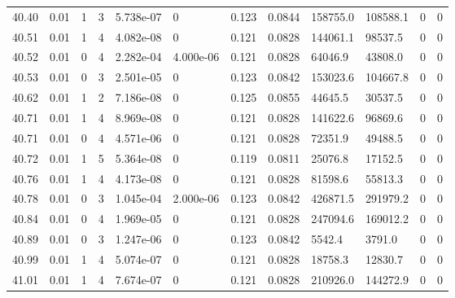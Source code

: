 \documentclass[preview]{standalone}
\begin{document}
{{{{{{{{{{{\begin{tabular}{L{1.2cm}C{1.2cm} C{0.3cm}C{0.5cm} C{1.4cm}C{1.4cm} C{1.4cm}C{1.4cm} C{1.6cm}C{1.6cm} C{1.6cm}C{1.6cm}}
  40.40  &  0.01  & 1     &  3 &  5.738e-07  & 0  &  0.123&   0.0844& 158755.0 & 108588.1   &  0 & 0  \\ 
  40.51  &  0.01  & 1     &  4 &  4.082e-08  & 0  &  0.121&   0.0828& 144061.1 & 98537.5   &  0 & 0  \\ 
  40.52  &  0.01  & 0     &  4 &  2.282e-04  & 4.000e-06  &  0.121&   0.0828& 64046.9 & 43808.0   &  0 & 0  \\ 
  40.53  &  0.01  & 0     &  3 &  2.501e-05  & 0  &  0.123&   0.0842& 153023.6 & 104667.8   &  0 & 0  \\ 
  40.62  &  0.01  & 1     &  2 &  7.186e-08  & 0  &  0.125&   0.0855& 44645.5 & 30537.5   &  0 & 0  \\ 
  40.71  &  0.01  & 1     &  4 &  8.969e-08  & 0  &  0.121&   0.0828& 141622.6 & 96869.6   &  0 & 0  \\ 
  40.71  &  0.01  & 0     &  4 &  4.571e-06  & 0  &  0.121&   0.0828& 72351.9 & 49488.5   &  0 & 0  \\ 
  40.72  &  0.01  & 1     &  5 &  5.364e-08  & 0  &  0.119&   0.0811& 25076.8 & 17152.5   &  0 & 0  \\ 
  40.76  &  0.01  & 1     &  4 &  4.173e-08  & 0  &  0.121&   0.0828& 81598.6 & 55813.3   &  0 & 0  \\ 
  40.78  &  0.01  & 0     &  3 &  1.045e-04  & 2.000e-06  &  0.123&   0.0842& 426871.5 & 291979.2   &  0 & 0  \\ 
  40.84  &  0.01  & 0     &  4 &  1.969e-05  & 0  &  0.121&   0.0828& 247094.6 & 169012.2   &  0 & 0  \\ 
  40.89  &  0.01  & 0     &  3 &  1.247e-06  & 0  &  0.123&   0.0842& 5542.4 & 3791.0   &  0 & 0  \\ 
  40.99  &  0.01  & 1     &  4 &  5.074e-07  & 0  &  0.121&   0.0828& 18758.3 & 12830.7   &  0 & 0  \\ 
  41.01  &  0.01  & 1     &  4 &  7.674e-07  & 0  &  0.121&   0.0828& 210926.0 & 144272.9   &  0 & 0  \\ 
\hline 
\end{tabular} 

}}}}}}}}}}}
\end{document}
